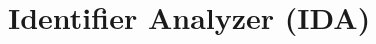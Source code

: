 \documentclass[a4paper,12pt]{report}
\begin{document}
%


%

%

%

\setcounter{chapter}{3}
\chapter{Identifier Analyzer (IDA)}


%



\end{document}
